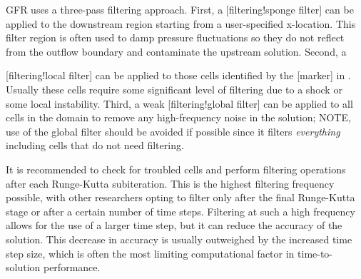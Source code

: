GFR uses a three-pass filtering approach.
%
First, a [filtering!sponge filter] can be applied
to the downstream region starting from a user-specified x-location.
This filter region is often used to damp pressure fluctuations so they do not
reflect from the outflow boundary and contaminate the upstream solution.
%
Second, a {[filtering!local filter] can be applied
to those cells identified by the
[marker] in .
%
Usually these cells require some significant level of filtering
due to a shock or some local instability.
%
Third, a weak [filtering!global filter] can be
applied to all cells in the domain to remove any high-frequency noise in the
solution; NOTE, use of the global filter should be avoided if possible since it
filters \emph{everything} including cells that do not need filtering.


It is recommended to check for troubled cells and perform 
filtering operations after each Runge-Kutta subiteration.
%
This is the highest filtering frequency possible, with other researchers
opting to filter only after the final Runge-Kutta stage or after a
certain number of time steps.
%
Filtering at such a high frequency allows for the use of a larger
time step, but it can reduce the accuracy of the solution.
%
This decrease in accuracy is usually outweighed by the increased
time step size, which is often the most limiting computational factor
in time-to-solution performance.


}
